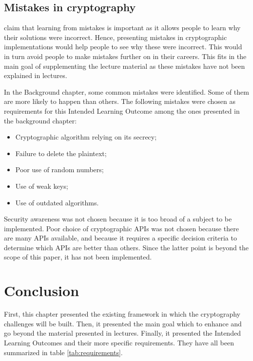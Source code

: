 \documentclass{l4proj}
\begin{document}
\subsection{Mistakes in cryptography}

\citet{eggleton_value_2001} claim that learning from mistakes is important as it allows people to 
learn why their solutions were incorrect. Hence, presenting mistakes in 
cryptographic implementations would help people to see why these were incorrect.
This would in turn avoid people to make mistakes further on in their careers.
This fits in the main goal of supplementing the lecture material as these mistakes 
have not been explained in lectures.

In the Background chapter, some common mistakes were identified. 
Some of them are more likely to happen than others.
The following mistakes were chosen as requirements for this Intended Learning Outcome among the ones presented in the background chapter:
\begin{itemize}
    \item Cryptographic algorithm relying on its secrecy;
    \item Failure to delete the plaintext;
    \item Poor use of random numbers;
    \item Use of weak keys;
    \item Use of outdated algorithms.
\end{itemize}
Security awareness was not chosen because it is too broad of a subject to be implemented. 
Poor choice of cryptographic APIs was not chosen because there are many APIs available,
and because it requires a specific decision criteria to determine which APIs are better than others.
Since the latter point is beyond the scope of this paper, it has not been implemented. 

\section{Conclusion}

First, this chapter presented the existing framework in which the cryptography challenges will be
built. Then, it presented the main goal which to enhance and go beyond the material presented in lectures.
Finally, it presented the Intended Learning Outcomes and their more specific requirements.
They have all been summarized in table \ref{tab:requirements}.
\end{document}
